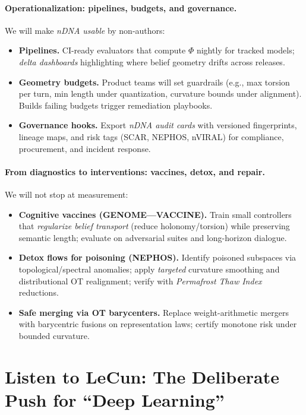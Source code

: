 \documentclass[11pt]{article}
\begin{document}
\paragraph{Operationalization: pipelines, budgets, and governance.}
We will make \emph{nDNA usable} by non-authors:
\begin{itemize}
  \item \textbf{Pipelines.} CI-ready evaluators that compute $\Phi$ nightly for tracked models; \emph{delta dashboards} highlighting where belief geometry drifts across releases.
  \item \textbf{Geometry budgets.} Product teams will set guardrails (e.g., max torsion per turn, min length under quantization, curvature bounds under alignment). Builds failing budgets trigger remediation playbooks.
  \item \textbf{Governance hooks.} Export \emph{nDNA audit cards} with versioned fingerprints, lineage maps, and risk tags (SCAR, NEPHOS, nVIRAL) for compliance, procurement, and incident response.
\end{itemize}

\paragraph{From diagnostics to interventions: vaccines, detox, and repair.}
We will not stop at measurement:
\begin{itemize}
  \item \textbf{Cognitive vaccines (GENOME—VACCINE).} Train small controllers that \emph{regularize belief transport} (reduce holonomy/torsion) while preserving semantic length; evaluate on adversarial suites and long-horizon dialogue.
  \item \textbf{Detox flows for poisoning (NEPHOS).} Identify poisoned subspaces via topological/spectral anomalies; apply \emph{targeted} curvature smoothing and distributional OT realignment; verify with \emph{Permafrost Thaw Index} reductions.
  \item \textbf{Safe merging via OT barycenters.} Replace weight-arithmetic mergers with barycentric fusions on representation laws; certify monotone risk under bounded curvature.
\end{itemize}







\section{Listen to LeCun: The Deliberate Push for ``Deep Learning''}
\end{document}
